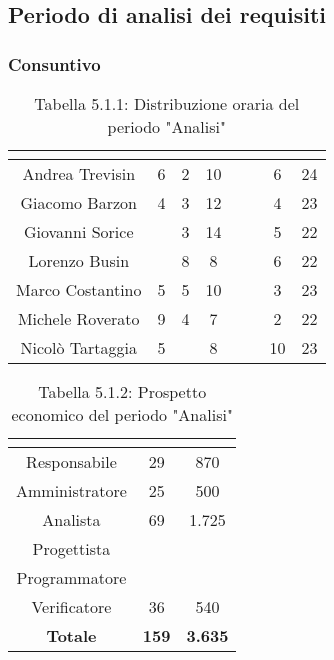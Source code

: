\subsection{Periodo di analisi dei requisiti}
\subsubsection{Consuntivo}
\renewcommand{\arraystretch}{1.5}
\begin{table}[H]
\begin{center}
\begin{tabular}{|c|c|c|c|c|c|c|c|}
\hline
\rowcolor{title_row}
\textbf{\color{title_text}{Nome}} & \textbf{\color{title_text}{Resp.}} & \textbf{\color{title_text}{Ammi.}} & \textbf{\color{title_text}{Analist.}} & \textbf{\color{title_text}{Progett.}} & \textbf{\color{title_text}{Program.}} & \textbf{\color{title_text}{Verific.}} & \textbf{\color{title_text}{Totale}} \\ \hline
Andrea Trevisin  & 6 & 2 & 10 & & & 6 & 24  \\ \hline
Giacomo Barzon   & 4 & 3 & 12 & & & 4 & 23  \\ \hline
Giovanni Sorice  & & 3 & 14 & & & 5 & 22  \\ \hline
Lorenzo Busin    & & 8 & 8 & & & 6 & 22  \\ \hline
Marco Costantino & 5 & 5 & 10 & & & 3 & 23 \\ \hline
Michele Roverato & 9 & 4 & 7 & & & 2 & 22 \\ \hline
Nicolò Tartaggia & 5 & & 8 & & & 10 & 23  \\ \hline
\end{tabular}
\caption{Tabella 5.1.1: Distribuzione oraria del periodo "Analisi"\label{}}
\end{center}
\end{table}
\renewcommand{\arraystretch}{1}

\renewcommand{\arraystretch}{1.5}
\begin{table}[H]
\begin{center}
\begin{tabular}{|c|c|c|}
\hline
\rowcolor{title_row}
\textbf{\color{title_text}{Ruolo}}  & \textbf{\color{title_text}{Ore}} & \textbf{\color{title_text}{Costo in \euro}} \\ \hline
Responsabile    & 29           & 870                 \\ \hline
Amministratore  & 25           & 500                 \\ \hline
Analista        & 69           & 1.725                \\ \hline
Progettista     &              &                     \\ \hline
Programmatore   &              &                     \\ \hline
Verificatore    & 36           & 540                 \\ \hline
\textbf{Totale} & \textbf{159}    & \textbf{3.635}    \\ \hline
\end{tabular}
\caption{Tabella 5.1.2: Prospetto economico del periodo "Analisi"\label{}}
\end{center}
\end{table}
\renewcommand{\arraystretch}{1}


